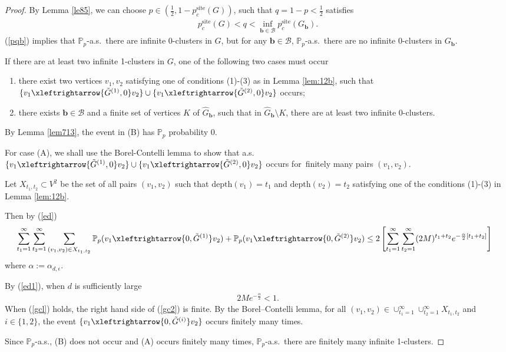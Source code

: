 \documentclass[11pt]{amsart}
\theoremstyle{plain}
\numberwithin{equation}{section}
\numberwithin{figure}{section}
\newcommand\PP{{\mathbb P}}
\newcommand\pcs{{p_c^{\mathrm{site}}}}
\begin{document}
\begin{proof}By Lemma \ref{le85}, we can choose $p\in \left(\frac{1}{2},1-\pcs(G)\right)$, such that $q=1-p<\frac{1}{2}$ satisfies
\begin{align}
\pcs(G)<q<\inf_{\mathbf{b}\in\mathcal{B}}\pcs(G_{\mathbf{b}}).\label{pqb}
\end{align}
(\ref{pqb}) implies that $\PP_p$-a.s.~there are infinite 0-clusters in $G$, but for any $\mathbf{b}\in \mathcal{B}$, $\PP_p$-a.s.~there are no infinite 0-clusters in $G_{\mathbf{b}}$. 





If there are at least two infinite 1-clusters in $G$, one of the following two cases must occur
\begin{enumerate}[label=(\Alph*)]
\item there exist two vertices $v_1,v_2$ satisfying one of conditions (1)-(3) as in Lemma \ref{lem:12b}, such that $\{v_1\xleftrightarrow{\tilde{G}^{(1)},0}v_2\}\cup \{v_1\xleftrightarrow{\tilde{G}^{(2)},0}v_2\}$ occurs;


\item there exists $\mathbf{b}\in \mathcal{B}$ and a finite set of vertices $K$ of $\widehat{G}_{\mathbf{b}}$, such that in $\widehat{G}_{\mathbf{b}}\setminus K$, there are at least two infinite 0-clusters.
\end{enumerate}

By Lemma \ref{lem713}, the event in (B) has $\PP_p$ probability 0.

For case (A), we shall use the Borel-Contelli lemma to show that a.s. $\{v_1\xleftrightarrow{\tilde{G}^{(1)},0}v_2\}\cup \{v_1\xleftrightarrow{\tilde{G}^{(2)},0}v_2\}$ occurs for~finitely many pairs $(v_1,v_2)$.

Let $X_{t_1,t_2}\subset V^2$ be the set of all pairs $(v_1,v_2)$  such that $\mathrm{depth}(v_1)=t_1$ and $\mathrm{depth}(v_2)=t_2$ satisfying one of the conditions (1)-(3) in Lemma \ref{lem:12b}.


Then by (\ref{ed})
\begin{align}
&\sum_{t_1=1}^{\infty}\sum_{t_2=1}^{\infty}\sum_{(v_1,v_2)\in X_{t_1,t_2}}\PP_p(v_1\xleftrightarrow{0,\tilde{G}^{(1)}} v_2)+\PP_p(v_1\xleftrightarrow{0,\tilde{G}^{(2)}} v_2)\leq 
2\left[\sum_{t_1=1}^{\infty}\sum_{t_2=1}^{\infty}(2M)^{t_1+t_2} e^{-\frac{\alpha}{2} \left[t_1+t_2\right] }\right]\label{gc2}
\end{align}
where $\alpha:=\alpha_{d,\epsilon}$.


By (\ref{ed1}), when $d$ is sufficiently large
\begin{align}
2Me^{-\frac{\alpha}{2}}<1.\label{gcl}
\end{align}
When (\ref{gcl}) holds, the right hand side of (\ref{gc2}) is finite.
By the Borel--Contelli lemma, for all $(v_1,v_2)\in\cup_{t_1=1}^{\infty}\cup_{t_2=1}^{\infty}X_{t_1,t_2}$ and $i\in\{1,2\}$, the event $\{v_1\xleftrightarrow{0,\tilde{G}^{(i)}} v_2\}$ occurs finitely many times. 

Since $\PP_p$-a.s., (B) does not occur and (A) occurs finitely many times, $\PP_p$-a.s.~there are finitely many infinite 1-clusters.
\end{proof}
\end{document}

